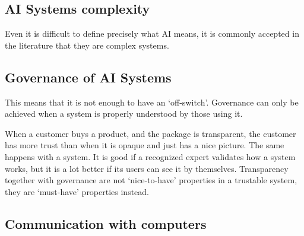 
\subsection{AI Systems complexity}

Even it is difficult to define precisely what AI means, it is commonly accepted in the literature that they are complex systems.

\subsection{Governance of AI Systems}

This means that it is not enough to have an `off-switch'.
Governance can only be achieved when a system is properly understood by those using it.

When a customer buys a product, and the package is transparent, the customer has more trust than when it is opaque and just has a nice picture.
The same happens with a system.
It is good if a recognized expert validates how a system works, but it is a lot better if its users can see it by themselves.
Transparency together with governance are not `nice-to-have' properties in a trustable system, they are `must-have' properties instead.

\subsection{Communication with computers}

